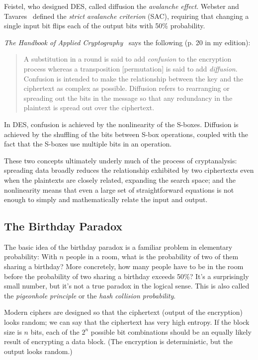 Feistel, who designed DES, called diffusion the \emph{avalanche
  effect}.  Webster and Tavares~\cite{webster86:avalanche} defined the
\emph{strict avalanche criterion} (SAC), requiring that changing a
single input bit flips each of the output bits with 50\% probability.

\emph{The Handbook of Applied Cryptography}~\cite{menezes1996handbook}
says the following (p. 20 in my edition):

\begin{quote}
A substitution in a round is said to add \emph{confusion} to the
encryption process whereas a transposition [permutation] is said to
add \emph{diffusion}. Confusion is intended to make the relationship
between the key and the ciphertext as complex as possible.  Diffusion
refers to rearranging or spreading out the bits in the message so that
any redundancy in the plaintext is spread out over the ciphertext.
\end{quote}

\aono{} In DES, confusion is achieved by the nonlinearity of the
S-boxes.  Diffusion is achieved by the shuffling of the bits between
S-box operations, coupled with the fact that the S-boxes use multiple
bits in an operation.

These two concepts ultimately underly much of the process of
cryptanalysis: spreading data broadly reduces the relationship
exhibited by two ciphertexts even when the plaintexts are closely
related, expanding the search space; and the nonlinearity means that
even a large set of straightforward equations is not enough to simply
and mathematically relate the input and output.

\subsection{The Birthday Paradox}
\label{sec:birthday}

The basic idea of the birthday paradox is a familiar problem in
elementary probability:
With $n$ people in a room, what is the probability of two of
them sharing a birthday?  More concretely, how many people have to be
in the room before the probability of two sharing a birthday exceeds
50\%?  It's a surprisingly small number, but it's not a true paradox in
the logical sense.  This is also called the \emph{pigeonhole principle} or
the \emph{hash collision probability}.

Modern ciphers are designed so that the ciphertext (output of the
encryption) looks random; we can say that the ciphertext has very high
entropy.  If the block size is $n$ bits, each of the $2^n$ possible
bit combinations should be an equally likely result of encrypting a
data block.  (The encryption is deterministic, but the output looks
random.)

